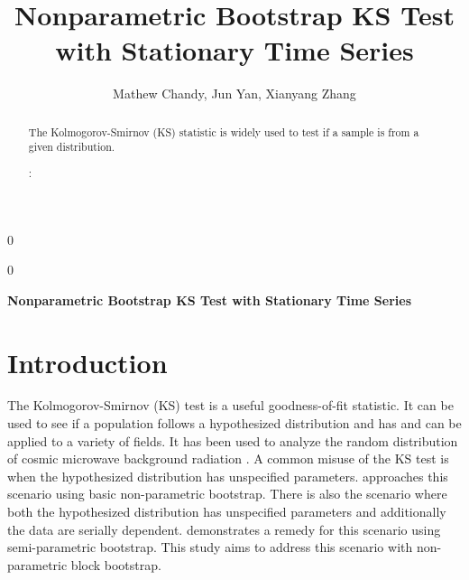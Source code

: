 \documentclass[12pt, letterpaper]{article}
\newcommand{\blind}{0}
\begin{document}

\blind
{
  \title{\bf Nonparametric Bootstrap KS Test with Stationary Time Series}
  \author{Mathew Chandy, %
  Jun Yan, %
  Xianyang Zhang\\
}
\date{}
  \maketitle
} \fi

\blind
{
  \bigskip
  \bigskip
  \bigskip
  \begin{center}
    {\LARGE\bf Nonparametric Bootstrap KS Test with Stationary Time Series}
\end{center}
  \bigskip
} \fi


\doublespace

\begin{abstract}

The Kolmogorov-Smirnov (KS) statistic is widely used to test if a sample is
from a given distribution.


\bigskip
{}:
\end{abstract}


\section{Introduction}
\label{sec:intro}

The Kolmogorov-Smirnov (KS) test is a useful goodness-of-fit statistic. It 
can be used to see if a population follows a hypothesized distribution and has 
and can be applied to a variety of fields. It has
been used to analyze the random distribution of cosmic microwave background 
radiation \citep{naess2012application}. A common misuse of the KS test is when
the hypothesized distribution has unspecified parameters. 
\citet{babu2004goodness} approaches this scenario using basic 
non-parametric bootstrap. There is also the scenario where both the hypothesized 
distribution has unspecified parameters and additionally the data are 
serially dependent. \citet{zeimbekakis2022misuses} demonstrates a remedy for
this scenario using semi-parametric bootstrap. This study aims to address this
scenario with non-parametric block bootstrap.
\end{document}
